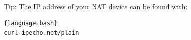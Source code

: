 Tip: The IP address of your NAT device can be found with:
\begin{lstlisting}{language=bash}
curl ipecho.net/plain
\end{lstlisting}

